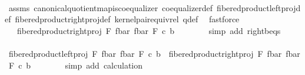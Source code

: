 \begin{isabellebody}
\ \ \ \ \ \ \isamarkupfalse%
\ assms{\isacharparenleft}{\kern0pt}{}{\isacharparenright}{\kern0pt}\ canonical{\isacharunderscore}{\kern0pt}quotient{\isacharunderscore}{\kern0pt}map{\isacharunderscore}{\kern0pt}is{\isacharunderscore}{\kern0pt}coequalizer\ coequalizer{\isacharunderscore}{\kern0pt}def\ fibered{\isacharunderscore}{\kern0pt}product{\isacharunderscore}{\kern0pt}left{\isacharunderscore}{\kern0pt}proj{\isacharunderscore}{\kern0pt}def\ fibered{\isacharunderscore}{\kern0pt}product{\isacharunderscore}{\kern0pt}right{\isacharunderscore}{\kern0pt}proj{\isacharunderscore}{\kern0pt}def\ kernel{\isacharunderscore}{\kern0pt}pair{\isacharunderscore}{\kern0pt}equiv{\isacharunderscore}{\kern0pt}rel\ q{\isacharunderscore}{\kern0pt}def\ \isamarkupfalse%
\ fastforce\isanewline
\ \ \ \ \isamarkupfalse%
\ \isamarkupfalse%
\ {\isachardoublequoteopen}{\isachardot}{\kern0pt}{\isachardot}{\kern0pt}{\isachardot}{\kern0pt}\ {\isacharequal}{\kern0pt}\ fibered{\isacharunderscore}{\kern0pt}product{\isacharunderscore}{\kern0pt}right{\isacharunderscore}{\kern0pt}proj\ F\ {\isacharparenleft}{\kern0pt}f{\isacharunderscore}{\kern0pt}bar{\isacharparenright}{\kern0pt}\ {\isacharparenleft}{\kern0pt}f{\isacharunderscore}{\kern0pt}bar{\isacharparenright}{\kern0pt}\ F\ {\isasymcirc}\isactrlsub c\ b{\isachardoublequoteclose}\isanewline
\ \ \ \ \ \ \isamarkupfalse%
\ {\isacharparenleft}{\kern0pt}simp\ add{\isacharcolon}{\kern0pt}\ right{\isacharunderscore}{\kern0pt}b{\isacharunderscore}{\kern0pt}eqs{\isacharparenright}{\kern0pt}\isanewline
\ \ \ \ \isamarkupfalse%
\ \isamarkupfalse%
\ {\isachardoublequoteopen}fibered{\isacharunderscore}{\kern0pt}product{\isacharunderscore}{\kern0pt}left{\isacharunderscore}{\kern0pt}proj\ F\ {\isacharparenleft}{\kern0pt}f{\isacharunderscore}{\kern0pt}bar{\isacharparenright}{\kern0pt}\ {\isacharparenleft}{\kern0pt}f{\isacharunderscore}{\kern0pt}bar{\isacharparenright}{\kern0pt}\ F\ {\isasymcirc}\isactrlsub c\ b\ {\isacharequal}{\kern0pt}\ fibered{\isacharunderscore}{\kern0pt}product{\isacharunderscore}{\kern0pt}right{\isacharunderscore}{\kern0pt}proj\ F\ {\isacharparenleft}{\kern0pt}f{\isacharunderscore}{\kern0pt}bar{\isacharparenright}{\kern0pt}\ {\isacharparenleft}{\kern0pt}f{\isacharunderscore}{\kern0pt}bar{\isacharparenright}{\kern0pt}\ F\ {\isasymcirc}\isactrlsub c\ b{\isachardoublequoteclose}\isanewline
\ \ \ \ \ \ \isamarkupfalse%
\ {\isacharparenleft}{\kern0pt}simp\ add{\isacharcolon}{\kern0pt}\ calculation{\isacharparenright}{\kern0pt}\isanewline

\end{isabellebody}

